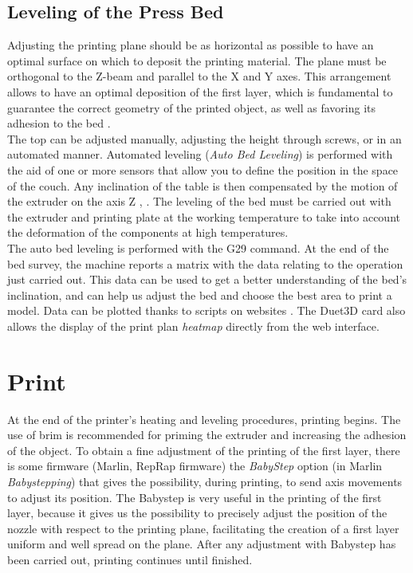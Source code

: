 \subsection{Leveling of the Press Bed}
Adjusting the printing plane should be as horizontal as possible to have an optimal surface on which to deposit the printing material. The plane must be orthogonal to the Z-beam and parallel to the X and Y axes. This arrangement allows to have an optimal deposition of the first layer, which is fundamental to guarantee the correct geometry of the printed object, as well as favoring its adhesion to the bed . \\
The top can be adjusted manually, adjusting the height through screws, or in an automated manner. Automated leveling (\emph{Auto Bed Leveling}) is performed with the aid of one or more sensors that allow you to define the position in the space of the couch. Any inclination of the table is then compensated by the motion of the extruder on the axis Z \parencite{Reference7}, \parencite{Reference8}. The leveling of the bed must be carried out with the extruder and printing plate at the working temperature to take into account the deformation of the components at high temperatures. \\
The auto bed leveling is performed with the G29 command. At the end of the bed survey, the machine reports a matrix with the data relating to the operation just carried out. This data can be used to get a better understanding of the bed's inclination, and can help us adjust the bed and choose the best area to print a model.
Data can be plotted thanks to scripts on websites \parencite{Reference9}. The Duet3D card also allows the display of the print plan \emph{heatmap} directly from the web \parencite{Reference10} interface.

\section{Print}
At the end of the printer's heating and leveling procedures, printing begins. The use of brim is recommended for priming the extruder and increasing the adhesion of the object.
To obtain a fine adjustment of the printing of the first layer, there is some firmware (Marlin, RepRap firmware) the \emph{BabyStep} option (in Marlin \emph{Babystepping}) that gives the possibility, during printing, to send axis movements to adjust its position. The Babystep is very useful in the printing of the first layer, because it gives us the possibility to precisely adjust the position of the nozzle with respect to the printing plane, facilitating the creation of a first layer uniform and well spread on the plane.
After any adjustment with Babystep has been carried out, printing continues until finished.
